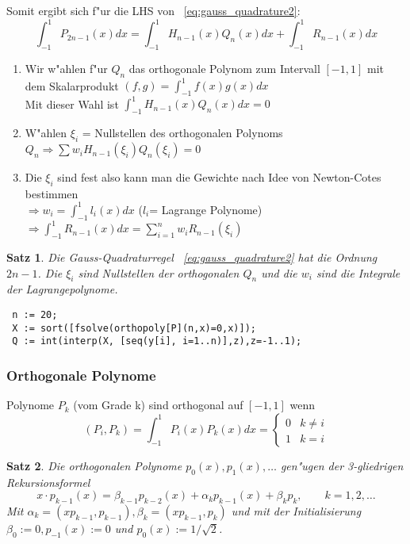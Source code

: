\documentclass[german, 10pt, a4paper, twocolumn]{scrartcl}
\newtheorem{satz}{Satz}[section]
\theoremstyle{definition}
\begin{document}
Somit ergibt sich f"ur die LHS von ~\ref{eq:gauss_quadrature2}:
\begin{displaymath}
	\int^1_{-1} P_{2n-1}(x) dx = \int^1_{-1} H_{n-1}(x) Q_n (x)dx + \int^1_{-1} R_{n-1}(x)dx
\end{displaymath}

\begin{enumerate}
	\item Wir w"ahlen f"ur $Q_n$ das orthogonale Polynom zum Intervall $[-1,1]$ mit dem Skalarprodukt $(f,g)=\int^1_{-1} f(x)g(x)dx$\\
		Mit dieser Wahl ist $\int^1_{-1}H_{n-1}(x)Q_n(x)dx = 0$
	\item W"ahlen $\xi_i$ = Nullstellen des orthogonalen Polynoms $Q_n\Rightarrow \sum w_i H_{n-1}(\xi_i)Q_n(\xi_i) = 0$
	\item Die $\xi_i$ sind fest also kann man die Gewichte nach Idee von Newton-Cotes bestimmen\\
		$\Rightarrow w_i = \int^1_{-1}l_i(x)dx$ ($l_i$= Lagrange Polynome)\\
		$\Rightarrow \int^1_{-1} R_{n-1} (x) dx = \sum^n_{i=1} w_iR_{n-1}(\xi_i)$
\end{enumerate}

\begin{satz}
	Die Gauss-Quadraturregel ~\ref{eq:gauss_quadrature2} hat die Ordnung $2n-1$. Die $\xi_i$ sind Nullstellen der orthogonalen $Q_n$ und die $w_i$ sind die Integrale der Lagrangepolynome.
\end{satz}

\begin{verbatim}
 n := 20;
 X := sort([fsolve(orthopoly[P](n,x)=0,x)]);
 Q := int(interp(X, [seq(y[i], i=1..n)],z),z=-1..1);
\end{verbatim}

\subsubsection{Orthogonale Polynome}

Polynome $P_k$ (vom Grade k) sind orthogonal auf $[-1,1]$ wenn
\begin{equation}
	(P_i, P_k) = \int^1_{-1} P_i(x) P_k(x) dx = \left \{
		\begin{array}{cc}
			0 &	k\neq i\\
			1 &	k = i
		\end{array}
	\right .
	\label{eq:skalarprodukt_ortho}
\end{equation}

\begin{satz}
	Die orthogonalen Polynome $p_0(x), p_1(x), \ldots$ gen"ugen der 3-gliedrigen Rekursionsformel
	\begin{displaymath}
		x \cdotp p_{k-1}(x) = \beta_{k-1}p_{k-2}(x) + \alpha_k p_{k-1}(x) + \beta_k p_k, \qquad k = 1,2,\ldots
	\end{displaymath}
	Mit $\alpha_k = (x p_{k-1}, p_{k-1}), \beta_k = (x p_{k-1},p_k)$ und mit der Initialisierung $\beta_0 := 0, p_{-1}(x) := 0$ und $p_0(x) := 1/\sqrt{2}$.
	\label{th:lanczos}
\end{satz}
\end{document}
